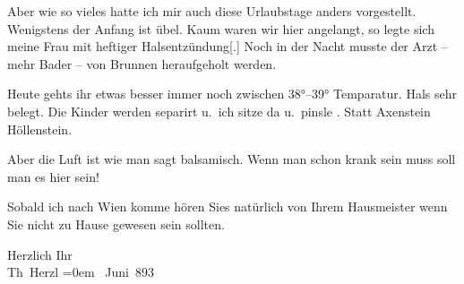 \pstart
           Aber wie so vieles hatte ich
      mir auch diese Urlaubstage
      anders vorgestellt. Wenigstens
      der Anfang ist übel. Kaum
      waren wir hier angelangt,
      so legte sich meine Frau
      mit heftiger Halsentzündung{[}.{]}
      Noch in der Nacht musste der
               Arzt – mehr Bader – von Brunnen
      heraufgeholt werden.\pend
           
\pstart
           Heute gehts ihr etwas besser {\pb}immer noch zwischen 38°–39°
         Temparatur. Hals sehr belegt. Die Kinder werden separirt
      u. ich sitze da u. pinsle
         \label{K_L03831-1v}\label{K_L03831-1}. Statt Axenstein
      Höllenstein.\pend
           
\pstart
           Aber die Luft ist wie man
      sagt balsamisch. Wenn man
      schon krank sein muss soll man
      es hier sein!\pend
           
\pstart
           Sobald ich nach Wien komme
      hören Sies natürlich von
      Ihrem Hausmeister wenn Sie
      nicht zu Hause gewesen sein
      sollten.\pend
           
\pstart
           Herzlich Ihr{\\[\baselineskip]}\spacefill\mbox{Th Herzl}\pend
           \leftskip=0em{}
 Juni 893\pend
           \endnumbering{}
\begin{anhang}
\end{anhang}
      